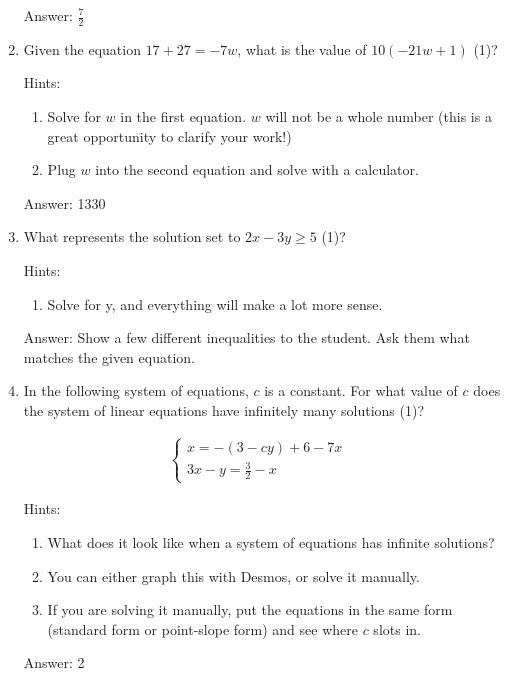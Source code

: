\documentclass{article}
\begin{document}
\begin{enumerate}
{	      Answer: \(\frac{7}{2}\)}

	\item {Given the equation \(17+27=-7w\), what is the value of \(10(-21w+1)\) (1)?

	      Hints:
	      \begin{enumerate}
		      \item {Solve for $w$ in the first equation. $w$ will not be a whole number (this is a great opportunity to clarify your work!)}
		      \item {Plug $w$ into the second equation and solve with a calculator.}
	      \end{enumerate}

	      Answer: 1330}
	\item {What represents the solution set to \(2x - 3y\geq5\) (1)?

	      Hints:
	      \begin{enumerate}
		      \item {Solve for y, and everything will make a lot more sense.}
	      \end{enumerate}

	      Answer: Show a few different inequalities to the student. Ask them what matches the given equation.}

	\item {In the following system of equations, $c$ is a constant. For what value of $c$ does the system of linear equations have infinitely many solutions (1)?

	      \[
		      \begin{array}{l}
			      \begin{cases}
				      x=-(3-cy)+6-7x & \\
				      3x-y=\frac{3}{2}-x
			      \end{cases}
		      \end{array}
	      \]

	      Hints:
	      \begin{enumerate}
		      \item{What does it look like when a system of equations has infinite solutions?}
		      \item{You can either graph this with Desmos, or solve it manually.}
		      \item{If you are solving it manually, put the equations in the same form (standard form or point-slope form) and see where $c$ slots in.}
	      \end{enumerate}

	      Answer: 2}


\end{enumerate}
\end{document}
